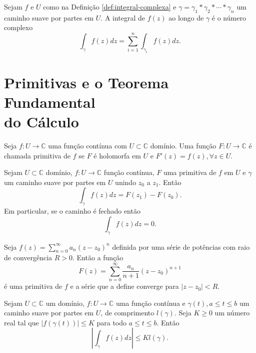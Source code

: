 \begin{definicao}
Sejam $f$ e $U$ como na Definição \ref{def:integral-complexa} e
$\gamma = \gamma_1*\gamma_2*\cdots*\gamma_n$ um caminho suave por partes em $U$.
A integral de $f(z)$ ao longo de $\gamma$ é o número complexo
\begin{equation*}
    \int_{\gamma} f(z)dz = \sum_{i=1}^n\int_{\gamma_i} f(z)dz.
\end{equation*}
\end{definicao}



\section[Primitivas e o Teorema Fundamental do Cálculo]
{Primitivas e o Teorema Fundamental\\ do Cálculo}

\begin{definicao}
\label{def:primitiva-complexa}
Seja $f:U \to \mathbb{C}$ uma função contínua com $U\subset\mathbb{C}$ domínio. Uma função $F:U\to\mathbb{C}$
é chamada primitiva de $f$ se $F$ é holomorfa em $U$ e $F'(z) = f(z), \forall z\in U$.
\end{definicao}

\begin{teorema}
Sejam $U\subset\mathbb{C}$ domínio, $f:U\to\mathbb{C}$ função contínua,
$F$ uma primitiva de $f$ em $U$ e $\gamma$ um caminho suave por partes em $U$ unindo $z_0$ a $z_1$. Então
\begin{equation*}
    \int_{\gamma} f(z)dz = F(z_1) - F(z_0).
\end{equation*}
Em particular, se o caminho é fechado então
\begin{equation*}
    \int_{\gamma} f(z)dz = 0.
\end{equation*}
\end{teorema}

\begin{proposicao}
Seja $\displaystyle{ f(z) = \sum_{n=0}^{\infty} a_n(z-z_0)^n }$
definida por uma série de potências com raio de convergência $R>0$.
Então a função
\begin{equation*}
    F(z) = \sum_{n=0}^{\infty} \frac{a_n}{n+1}(z-z_0)^{n+1}
\end{equation*}
é uma primitiva de $f$ e a série que a define converge para $|z-z_0| < R$.
\end{proposicao}

\begin{lema}
\label{lema-tecnico}
Sejam $U\subset\mathbb{C}$ um domínio, $f:U\to\mathbb{C}$ uma função contínua e
$\gamma(t), a\leq t\leq b$ um caminho suave por partes em $U$, de comprimento $l(\gamma)$.
Seja $K\geq 0$ um número real tal que $|f(\gamma(t))| \leq K$ para todo $a\leq t\leq b$. Então
\begin{equation*}
    \left| \int_{\gamma}f(z)dz \right| \leq Kl(\gamma).
\end{equation*}
\end{lema}

